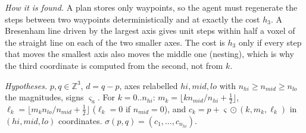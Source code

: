 \documentclass[11pt,a4paper]{article}
\begin{document}
\noindent\emph{How it is found.} A plan stores only waypoints, so the agent must regenerate the steps between two waypoints deterministically and at
exactly the cost $h_3$. A Bresenham line driven by the largest axis gives unit steps within half a voxel of the
straight line on each of the two smaller axes. The cost is $h_3$ only if every step that moves the smallest axis also
moves the middle one (nesting), which is why the third coordinate is computed from the second, not from $k$.

\noindent\emph{Hypotheses.} $p,q\in\mathbb Z^3$, $d=q-p$, axes relabelled $hi,mid,lo$ with $n_{hi}\ge n_{mid}\ge n_{lo}$ the
magnitudes, signs $\varsigma_a$. For $k=0..n_{hi}$: $m_k=\lfloor kn_{mid}/n_{hi}+\frac12\rfloor$,
$\ell_k=\lfloor m_kn_{lo}/n_{mid}+\frac12\rfloor$ ($\ell_k=0$ if $n_{mid}=0$), and
$c_k=p+\varsigma\odot(k,m_k,\ell_k)$ in $(hi,mid,lo)$ coordinates. $\sigma(p,q)=(c_1,\dots,c_{n_{hi}})$.
\end{document}
